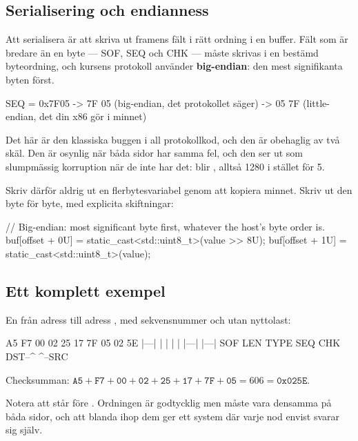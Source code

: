 \subsection{Serialisering och endianness}

Att serialisera är att skriva ut framens fält i rätt ordning i en buffer. Fält som är bredare än
en byte --- SOF, SEQ och CHK --- måste skrivas i en bestämd byteordning, och kursens protokoll
använder \textbf{big-endian}: den mest signifikanta byten först.

\begin{console}
SEQ = 0x7F05  ->  7F 05      (big-endian, det protokollet säger)
              ->  05 7F      (little-endian, det din x86 gör i minnet)
\end{console}

Det här är den klassiska buggen i all protokollkod, och den är obehaglig av två skäl. Den är
osynlig när båda sidor har samma fel, och den ser ut som slumpmässig korruption när de inte har
det:  blir , alltså 1280 i stället för 5.

Skriv därför aldrig ut en flerbytesvariabel genom att kopiera minnet. Skriv ut den byte för byte,
med explicita skiftningar:

\begin{cppcode}
// Big-endian: most significant byte first, whatever the host's byte order is.
buf[offset + 0U] = static_cast<std::uint8_t>(value >> 8U);
buf[offset + 1U] = static_cast<std::uint8_t>(value);
\end{cppcode}

\subsection{Ett komplett exempel}

En  från adress  till adress , med sekvensnummer
 och utan nyttolast:

\begin{console}
A5 F7 00 02 25 17 7F 05 02 5E
|---| |  |  |  |  |---| |---|
SOF  LEN TYPE      SEQ   CHK
        DST--^  ^--SRC
\end{console}

Checksumman: $\mathtt{A5} + \mathtt{F7} + \mathtt{00} + \mathtt{02} + \mathtt{25} + \mathtt{17} +
\mathtt{7F} + \mathtt{05} = 606 = \mathtt{0x025E}$.

Notera att  står före . Ordningen är godtycklig men måste vara densamma på
båda sidor, och att blanda ihop dem ger ett system där varje nod envist svarar sig själv.
